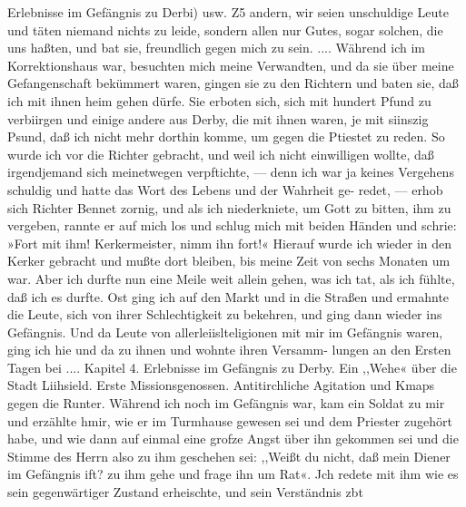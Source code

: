Erlebnisse im Gefängnis zu Derbi) usw. Z5
andern, wir seien unschuldige Leute und täten niemand nichts zu
leide, sondern allen nur Gutes, sogar solchen, die uns haßten,
und bat sie, freundlich gegen mich zu sein. ....
Während ich im Korrektionshaus war, besuchten mich meine
Verwandten, und da sie über meine Gefangenschaft bekümmert
waren, gingen sie zu den Richtern und baten sie, daß ich mit
ihnen heim gehen dürfe. Sie erboten sich, sich mit hundert Pfund
zu verbiirgen und einige andere aus Derby, die mit ihnen waren,
je mit siinszig Psund, daß ich nicht mehr dorthin komme, um
gegen die Ptiestet zu reden. So wurde ich vor die Richter
gebracht, und weil ich nicht einwilligen wollte, daß irgendjemand
sich meinetwegen verpftichte, — denn ich war ja keines Vergehens
schuldig und hatte das Wort des Lebens und der Wahrheit ge-
redet, — erhob sich Richter Bennet zornig, und als ich niederkniete, um
Gott zu bitten, ihm zu vergeben, rannte er auf mich los und schlug
mich mit beiden Händen und schrie: »Fort mit ihm! Kerkermeister,
nimm ihn fort!« Hierauf wurde ich wieder in den Kerker gebracht
und mußte dort bleiben, bis meine Zeit von sechs Monaten um
war. Aber ich durfte nun eine Meile weit allein gehen, was ich
tat, als ich fühlte, daß ich es durfte. Ost ging ich auf den Markt
und in die Straßen und ermahnte die Leute, sich von ihrer
Schlechtigkeit zu bekehren, und ging dann wieder ins Gefängnis.
Und da Leute von allerleiislteligionen mit mir im Gefängnis
waren, ging ich hie und da zu ihnen und wohnte ihren Versamm-
lungen an den Ersten Tagen bei ....
Kapitel 4.
Erlebnisse im Gefängnis zu Derby. Ein ,,Wehe« über die Stadt
Liihsield. Erste Missionsgenossen. Antitirchliche Agitation und
Kmaps gegen die Runter.
Während ich noch im Gefängnis war, kam ein Soldat zu
mir und erzählte hmir, wie er im Turmhause gewesen sei und dem
Priester zugehört habe, und wie dann auf einmal eine grofze Angst
über ihn gekommen sei und die Stimme des Herrn also zu ihm
geschehen sei: ,,Weißt du nicht, daß mein Diener im Gefängnis
ift? zu ihm gehe und frage ihn um Rat«. Jch redete mit ihm
wie es sein gegenwärtiger Zustand erheischte, und sein Verständnis
zbt


